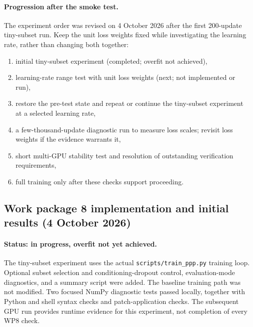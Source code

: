 \documentclass[11pt,a4paper]{article}
\begin{document}
\paragraph{Progression after the smoke test.}
The experiment order was revised on 4 October 2026 after the first
200-update tiny-subset run. Keep the unit loss weights fixed while
investigating the learning rate, rather than changing both together:
\begin{enumerate}[label=\arabic*.]
    \item initial tiny-subset experiment (completed; overfit not achieved),
    \item learning-rate range test with unit loss weights (next; not implemented or run),
    \item restore the pre-test state and repeat or continue the tiny-subset
          experiment at a selected learning rate,
    \item a few-thousand-update diagnostic run to measure loss scales;
          revisit loss weights if the evidence warrants it,
    \item short multi-GPU stability test and resolution of outstanding
          verification requirements,
    \item full training only after these checks support proceeding.
\end{enumerate}

\subsection*{Work package 8 implementation and initial results
(4 October 2026)}

\paragraph{Status: in progress, overfit not yet achieved.}
The tiny-subset experiment uses the actual \texttt{scripts/train\_ppp.py}
training loop. Optional subset selection and conditioning-dropout control,
evaluation-mode diagnostics, and a summary script were added. The
baseline training path was not modified. Two focused NumPy diagnostic
tests passed locally, together with Python and shell syntax checks and
patch-application checks. The subsequent GPU run provides runtime
evidence for this experiment, not completion of every WP8 check.
\end{document}
